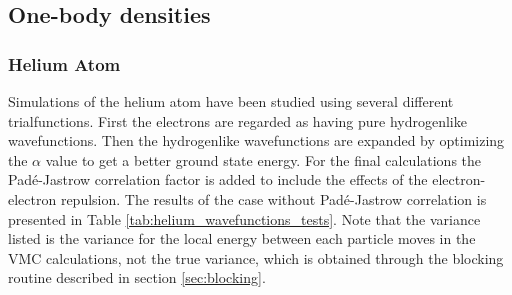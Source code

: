 		\begin{table}
			\center %
			\protect\caption{ Comparison of energies found using bisection method with the refenrence energy \cite{Koput_2011_PCCP} \cite{Binkley_1975} and comparison of the time used running the computation with the given number of cycles using GTOs and STOs.}
			\label{tab:AtomsGTO} 
		\end{table}

	\subsection{One-body densities}
		\subsubsection{Helium Atom}
			Simulations of the helium atom have been
                        studied using several different
                        trialfunctions. First the electrons are
                        regarded as having pure hydrogenlike
                        wavefunctions. Then the hydrogenlike
                        wavefunctions are expanded by optimizing the
                        \(\alpha \) value to get a better ground state
                        energy. For the final calculations the
                        Padé-Jastrow correlation factor is added to
                        include the effects of the electron-electron
                        repulsion. The results of the case without
                        Padé-Jastrow correlation is presented in Table
                        \ref{tab:helium_wavefunctions_tests}. Note
                        that the variance listed is the variance for
                        the local energy between each particle moves in
                        the VMC calculations, not the true variance, which is
                        obtained through the blocking routine
                        described in section \ref{sec:blocking}.


